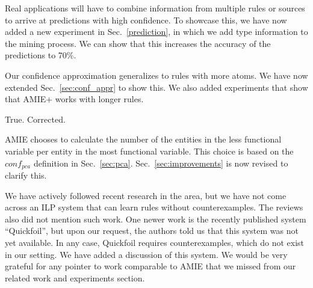 Real applications will have to combine information from multiple rules or sources to arrive at predictions with high confidence. To showcase this, we have now added a new experiment in Sec.~\ref{prediction}, in which we add type information to the mining process. We can show that this increases the accuracy of the predictions to 70\%.


   Our confidence approximation generalizes to rules with more atoms. We have now extended Sec.~\ref{sec:conf_appr} to show this. We also added experiments that show that AMIE+ works with longer rules.


   True. Corrected.


   AMIE chooses to calculate the number of the entities in the less functional variable per entity in the most functional variable. This choice is based on the $conf_{pca}$ definition in Sec.~\ref{sec:pca}.
   Sec.~\ref{sec:improvements} is now revised to clarify this.


We have actively followed recent research in the area, but we have not come across an ILP system that can learn rules without counterexamples. The reviews also did not mention such work. One newer work is the recently published system ``Quickfoil'', but upon our request, the authors told us that this system was not yet available. In any case, Quickfoil requires counterexamples, which do not exist in our setting. We have added a discussion of this system. We would be very grateful for any pointer to work comparable to AMIE that we missed from our related work and experiments section.

